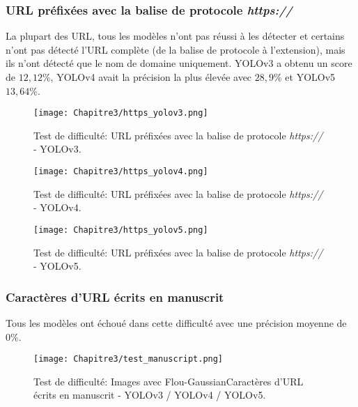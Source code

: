           \subsubsection{URL préfixées avec la balise de protocole \textit{https://}}
          La plupart des URL, tous les modèles n'ont pas réussi à les détecter et certains n'ont pas détecté l'URL complète (de la balise de protocole à l'extension), mais ils n'ont détecté que le nom de domaine uniquement.
          YOLOv3 a obtenu un score de $12,12\%$, YOLOv4 avait la précision la plus élevée avec $28,9\%$ et YOLOv5 $13,64\%$.
          \begin{figure}[H]
               \centering
                \texttt{[image: Chapitre3/https\_yolov3.png]}
                \caption{Test de difficulté: URL préfixées avec la balise de protocole \textit{https://} - YOLOv3.}
                \label{y3_t4}
                \end{figure}
          \begin{figure}[H]
                    \centering
                    \texttt{[image: Chapitre3/https\_yolov4.png]}
                    \caption{Test de difficulté: URL préfixées avec la balise de protocole \textit{https://} - YOLOv4.}
                    \label{y4_https}
                    \end{figure}
          \begin{figure}[H]
                    \centering
                    \texttt{[image: Chapitre3/https\_yolov5.png]}
                    \caption{Test de difficulté: URL préfixées avec la balise de protocole \textit{https://} - YOLOv5.}
                    \label{y5_https}
                    \end{figure}

          \subsubsection{Caractères d'URL écrits en manuscrit}
          Tous les modèles ont échoué dans cette difficulté avec une précision moyenne de $0\%$.
          \begin{figure}[H]
                    \centering
                    \texttt{[image: Chapitre3/test\_manuscript.png]}
                    \caption{Test de difficulté: Images avec Flou-GaussianCaractères d'URL écrits en manuscrit - YOLOv3 / YOLOv4 / YOLOv5.}
                    \label{test_manuscrit}
                    \end{figure}


